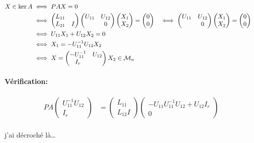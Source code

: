 \documentclass{article}
\begin{document}
\begin{align*}
    X \in \ker A &\iff PAX = 0 \\
                 &\iff \begin{pmatrix} L_{11} & \\ L_{21} & I \end{pmatrix} \begin{pmatrix} U_{11} & U_{12} \\ & 0 \end{pmatrix} \begin{pmatrix} X_1 \\X_2 \end{pmatrix} = \begin{pmatrix} 0 \\ 0 \end{pmatrix} 
                 &\iff \begin{pmatrix} U_{11} & U_{12} \\ & 0 \end{pmatrix} \begin{pmatrix} X_1 \\ X_2 \end{pmatrix} &= \begin{pmatrix} 0 \\ 0 \end{pmatrix} \\
                 &\iff U_{11} X_1 + U_{12} X_2 = 0 \\
                 &\iff X_1 = -U_{11}^{-1} U_{12} X_2 \\
                 &\iff X = \begin{pmatrix} -U_{11}^{-1} &U_{12} \\ I_r \end{pmatrix} X_2 \in \mathcal{M}_n
\end{align*}

\paragraph{Vérification:}

\begin{align*}
    PA \begin{pmatrix} U_{11}^{-1} U_{12} \\ I_r \end{pmatrix} &= \begin{pmatrix} L_{11} \\ L_{12} I \end{pmatrix} \begin{pmatrix} -U_{11} U_{11}^{-1} U_{12} + U_{12} I_r \\ 0 \end{pmatrix}  \\
\end{align*}

j'ai décroché là…
\end{document}
